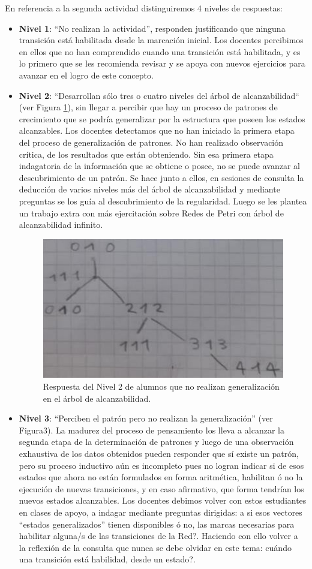 \documentclass[oneside,spanish]{amsart}
\numberwithin{equation}{section}
\theoremstyle{definition}
\begin{document}
En referencia a la segunda actividad distinguiremos 4 niveles de respuestas: 
\begin{itemize}
	\item \textbf{Nivel 1}: “No realizan la actividad”, responden justificando que ninguna transición está habilitada desde la marcación inicial. Los docentes percibimos en ellos que no han comprendido cuando una transición está habilitada, y es lo primero que se les recomienda revisar y se apoya con nuevos ejercicios para avanzar en el logro de este concepto.
	\item \textbf{Nivel 2}: “Desarrollan sólo tres o cuatro niveles del árbol de alcanzabilidad“ (ver Figura \ref{fig:2}), sin llegar a percibir que hay un proceso de patrones de crecimiento que se podría generalizar por la estructura que poseen los estados alcanzables. Los docentes detectamos que no han iniciado la primera etapa del proceso de generalización de patrones. No han realizado observación crítica, de los resultados que están obteniendo. Sin esa primera etapa indagatoria de la información que se obtiene o posee, no se puede avanzar al descubrimiento de un patrón. Se hace junto a ellos, en sesiones de consulta la deducción de varios niveles más del árbol de alcanzabilidad y mediante preguntas se los guía al descubrimiento de la regularidad. Luego se les plantea un trabajo extra con más ejercitación sobre Redes de Petri con árbol de alcanzabilidad infinito.
	
	\begin{figure}[h]
		\centering
		\includegraphics[width=0.45\linewidth]{Anexos-07/Imagen2}
		\caption{Respuesta del Nivel 2 de alumnos que no realizan generalización en el árbol de alcanzabilidad.}
		\label{fig:2}
	\end{figure}
	
	\item \textbf{Nivel 3}: “Perciben el patrón pero no realizan la generalización” (ver Figura3). La madurez del proceso de pensamiento los lleva a alcanzar la segunda etapa de la determinación de patrones y luego de una observación exhaustiva de los datos obtenidos pueden responder que sí existe un patrón, pero su proceso inductivo aún es incompleto pues no logran indicar si de esos estados que ahora no están formulados en forma aritmética, habilitan ó no la ejecución de nuevas transiciones, y en caso afirmativo, que forma tendrían los nuevos estados alcanzables. Los docentes debimos volver con estos estudiantes en clases de apoyo, a indagar mediante preguntas dirigidas: a si esos vectores “estados generalizados” tienen disponibles ó no, las marcas necesarias para habilitar alguna/s de las transiciones de la Red?. Haciendo con ello volver a la reflexión de la consulta que nunca se debe olvidar en este tema: cuándo una transición está habilidad, desde un estado?.
	

\end{itemize}
\end{document}

